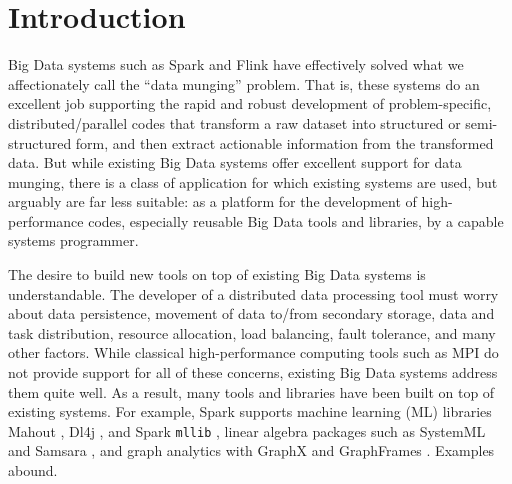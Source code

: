 
\section{Introduction}

Big Data systems such as Spark \cite{zaharia2010spark} and Flink \cite{alexandrov2014stratosphere, carbone2015apache}
have effectively solved what we affectionately call the ``data munging'' problem.  That is, 
these systems do an excellent job supporting the rapid
and robust development of problem-specific,
distributed/parallel codes that transform a raw dataset into structured 
or semi-structured form, and then
extract actionable information from the transformed data.
But while existing Big Data systems offer
excellent support for data munging,
there is a class of application for which 
existing systems are 
used, but arguably are far less suitable:
as a platform 
for the development of high-performance codes, especially reusable
Big Data tools and libraries, by a capable
systems programmer.

The desire to build new tools
on top of existing Big Data systems is understandable.  
The  developer of a distributed data processing tool must worry about data persistence, movement of
data to/from secondary storage, data
and task distribution, resource allocation, load balancing, fault tolerance, and many other factors.
While classical high-performance computing
tools such as MPI \cite{gropp1996high} do not provide support for all of these concerns,
existing Big Data systems 
address them quite well.
As a result, many tools and libraries have been built on top of existing systems.  For example,
Spark supports
machine learning (ML) libraries Mahout \cite{mahout}, Dl4j \cite{dj4j}, 
and Spark \texttt{mllib} \cite{meng2016mllib}, linear algebra packages such as SystemML \cite{tian2012scalable, boehm2016systemml, ghoting2011systemml, boehm2014hybrid} and Samsara \cite{samsara}, and graph analytics with
GraphX \cite{gonzalez2014graphx} and GraphFrames
\cite{dave2016graphframes}.  Examples abound.

